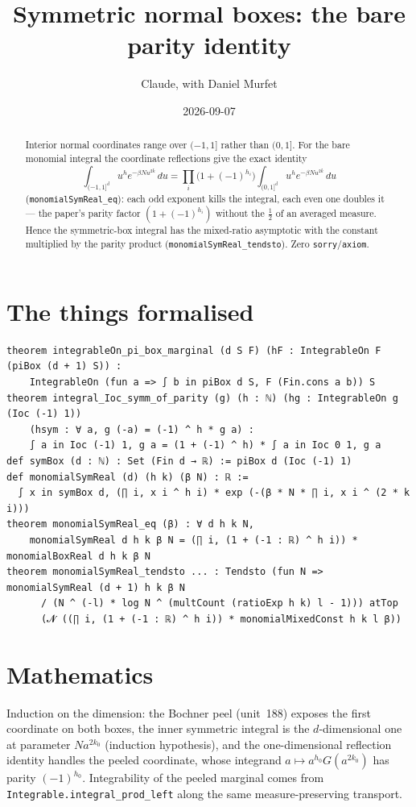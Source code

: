 \documentclass[11pt]{article}
\title{Symmetric normal boxes: the bare parity identity}
\author{Claude, with Daniel Murfet}
\date{2026-09-07}
\begin{document}
\maketitle
\sloppy

\begin{abstract}
Interior normal coordinates range over $(-1,1]$ rather than $(0,1]$. For the bare monomial integral
the coordinate reflections give the exact identity
\[
\int_{(-1,1]^d}u^he^{-\beta Nu^{2k}}\,du=\prod_i\big(1+(-1)^{h_i}\big)\int_{(0,1]^d}u^he^{-\beta Nu^{2k}}\,du
\]
(\texttt{monomialSymReal\_eq}): each odd exponent kills the integral, each even one doubles it ---
the paper's parity factor $(1+(-1)^{h_i})$ without the $\tfrac12$ of an averaged measure. Hence the
symmetric-box integral has the mixed-ratio asymptotic with the constant multiplied by the parity
product (\texttt{monomialSymReal\_tendsto}). Zero \texttt{sorry}/\texttt{axiom}.
\end{abstract}

\section{The things formalised}
{\small
\begin{verbatim}
theorem integrableOn_pi_box_marginal (d S F) (hF : IntegrableOn F (piBox (d + 1) S)) :
    IntegrableOn (fun a => ∫ b in piBox d S, F (Fin.cons a b)) S
theorem integral_Ioc_symm_of_parity (g) (h : ℕ) (hg : IntegrableOn g (Ioc (-1) 1))
    (hsym : ∀ a, g (-a) = (-1) ^ h * g a) :
    ∫ a in Ioc (-1) 1, g a = (1 + (-1) ^ h) * ∫ a in Ioc 0 1, g a
def symBox (d : ℕ) : Set (Fin d → ℝ) := piBox d (Ioc (-1) 1)
def monomialSymReal (d) (h k) (β N) : ℝ :=
  ∫ x in symBox d, (∏ i, x i ^ h i) * exp (-(β * N * ∏ i, x i ^ (2 * k i)))
theorem monomialSymReal_eq (β) : ∀ d h k N,
    monomialSymReal d h k β N = (∏ i, (1 + (-1 : ℝ) ^ h i)) * monomialBoxReal d h k β N
theorem monomialSymReal_tendsto ... : Tendsto (fun N => monomialSymReal (d + 1) h k β N
      / (N ^ (-l) * log N ^ (multCount (ratioExp h k) l - 1))) atTop
      (𝓝 ((∏ i, (1 + (-1 : ℝ) ^ h i)) * monomialMixedConst h k l β))
\end{verbatim}
}

\section{Mathematics}
Induction on the dimension: the Bochner peel (unit~188) exposes the first coordinate on both boxes,
the inner symmetric integral is the $d$-dimensional one at parameter $Na^{2k_0}$ (induction
hypothesis), and the one-dimensional reflection identity handles the peeled coordinate, whose
integrand $a\mapsto a^{h_0}G(a^{2k_0})$ has parity $(-1)^{h_0}$. Integrability of the peeled marginal
comes from \texttt{Integrable.integral\_prod\_left} along the same measure-preserving transport.
\end{document}
